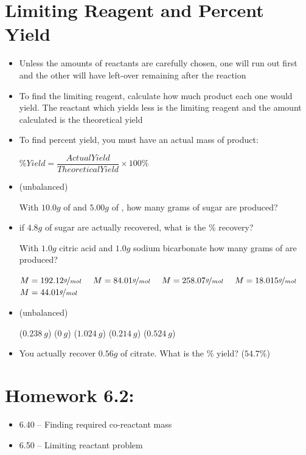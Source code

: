 \documentclass[12pt, openany, letterpaper]{memoir}
\begin{document}
\section{Limiting Reagent and Percent Yield}
\begin{itemize}
	\item Unless the amounts of reactants are carefully chosen, one will run out first and the other will have left-over remaining after the reaction
	\item To find the limiting reagent, calculate how much product each one would yield. The reactant which yields less is the limiting reagent and the amount calculated is the theoretical yield
	\item To find percent yield, you must have an actual mass of product:

	      $\% Yield = \dfrac{Actual Yield}{Theoretical Yield}\times 100\%$
	\item {} (unbalanced)

	      With $10.0g$ of  and $5.00g$ of , how many grams of sugar are produced?
	\item if $4.8g$ of sugar are actually recovered, what is the \% recovery?


	      With $1.0g$ citric acid and $1.0g$ sodium bicarbonate how many grams of  are produced?

	      $M=192.12\nicefrac{g}{mol}$ ~ $M=84.01\nicefrac{g}{mol}$ ~ $M=258.07\nicefrac{g}{mol}$ ~ $M=18.015\nicefrac{g}{mol}$ ~ $M=44.01\nicefrac{g}{mol}$





	\item {} (unbalanced)

	      ($0.238~g$) \hspace{0.2em} ($0~g$) \hspace{3em} ($1.024~g$) \hspace{1.5em} ($0.214~g$) \hspace{1.5em} ($0.524~g$)

	\item You actually recover $0.56g$ of citrate. What is the \% yield? ($54.7\%$)
\end{itemize}

\section*{Homework 6.2:}
\begin{itemize}
	\item 6.40 -- Finding required co-reactant mass
	\item 6.50 -- Limiting reactant problem
\end{itemize}
\end{document}
